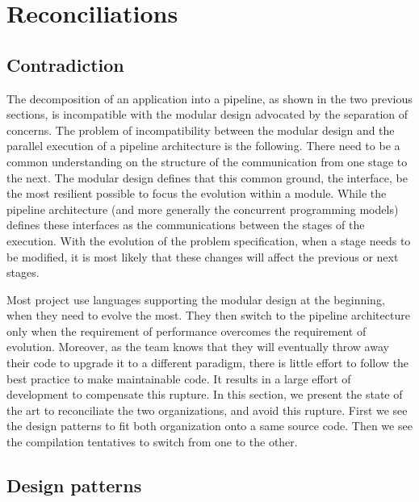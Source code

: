 \section{Reconciliations} \label{chapter3:reconciliations}

\subsection{Contradiction}

The decomposition of an application into a pipeline, as shown in the two previous sections, is incompatible with the modular design advocated by the separation of concerns.
The problem of incompatibility between the modular design and the parallel execution of a pipeline architecture is the following.
There need to be a common understanding on the structure of the communication from one stage to the next.
The modular design defines that this common ground, the interface, be the most resilient possible to focus the evolution within a module.
While the pipeline architecture (and more generally the concurrent programming models) defines these interfaces as the communications between the stages of the execution.
With the evolution of the problem specification, when a stage needs to be modified, it is most likely that these changes will affect the previous or next stages.

Most project use languages supporting the modular design at the beginning, when they need to evolve the most.
They then switch to the pipeline architecture only when the requirement of performance overcomes the requirement of evolution.
Moreover, as the team knows that they will eventually throw away their code to upgrade it to a different paradigm, there is little effort to follow the best practice to make maintainable code.
It results in a large effort of development to compensate this rupture.
In this section, we present the state of the art to reconciliate the two organizations, and avoid this rupture.
First we see the design patterns to fit both organization onto a same source code.
Then we see the compilation tentatives to switch from one to the other.

\subsection{Design patterns}

